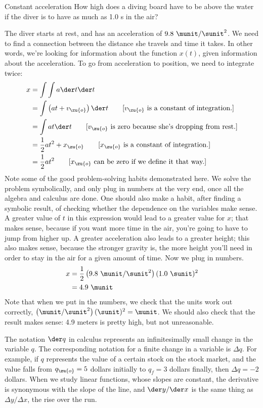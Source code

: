 \begin{eg}{Constant acceleration}\label{eg:diving-board}
\egquestion
How high does a diving board have to be above the water if the diver is to have as much as 1.0 s
in the air?

\eganswer
The diver starts at rest, and has an acceleration of $9.8\ \munit/\sunit^2$. 
We need to find a connection between the distance she travels and time it takes. In other words,
we're looking for information about the function $x(t)$, given information about the acceleration.
To go from acceleration to position, we need to integrate twice:
\begin{align*}
  x &= \int \int a \der t \der t \\
    &= \int \left(at+v_\zu{o}\right) \der t \qquad \text{[$v_\zu{o}$ is a constant of integration.]} \\
    &= \int at \der t \qquad \text{[$v_\zu{o}$ is zero because she's dropping from rest.]} \\
    &= \frac{1}{2}at^2+x_\zu{o} \qquad \text{[$x_\zu{o}$ is a constant of integration.]} \\
    &= \frac{1}{2}at^2 \qquad \text{[$x_\zu{o}$ can be zero if we define it that way.]}
\end{align*}
Note some of the good problem-solving habits demonstrated here. We solve the problem symbolically, and only
plug in numbers at the very end, once all the algebra and calculus are done. One should also make
a habit, after finding a symbolic result, of checking whether the dependence on the variables
make sense. A greater value of $t$ in this expression would lead to a greater value for $x$; that makes
sense, because if you want more time in the air, you're going to have to jump from higher up. A greater
acceleration also leads to a greater height; this also makes sense, because the stronger gravity is,
the more height you'll need in order to stay in the air for a given amount of time.
Now we plug in numbers.
\begin{align*}
  x  &= \frac{1}{2}\left(9.8\ \munit/\sunit^2\right)(1.0\ \sunit)^2  \\
    &= 4.9\ \munit
\end{align*}
Note that when we put in the numbers,
we check that the units work out correctly, $\left(\munit/\sunit^2\right)(\sunit)^2=\munit$. We should
also check that the result makes sense: 4.9 meters is pretty high, but not unreasonable.
\end{eg}

The notation $\der q$ in calculus represents an infinitesimally small change in the variable $q$.
The corresponding notation for a finite change in a variable is $\Delta q$. For example,
if $q$ represents the value of a certain stock on the stock market, and the value falls from
$q_\zu{o}=5$ dollars initially to $q_f=3$ dollars finally, then $\Delta q=-2$ dollars. When we
study linear functions, whose slopes are constant, the derivative is synonymous with the slope
of the line, and $\der y/\der x$ is the same thing as $\Delta y/\Delta x$,
the rise over the run.

